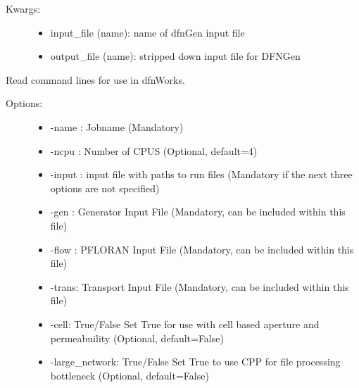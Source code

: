 \documentclass[letterpaper,10pt,english]{sphinxmanual}
\begin{document}
\begin{fulllineitems}
\begin{fulllineitems}
\begin{description}
\begin{itemize}
\end{itemize}

\item[{Kwargs:}] \leavevmode\begin{itemize}
\item {} 
input\_file (name): name of dfnGen input file

\item {} 
output\_file (name): stripped down input file for DFNGen

\end{itemize}

\end{description}

\end{fulllineitems}


\begin{fulllineitems}
\label{pydfnworks:pydfnworks.DFNWORKS.commandline_options}
Read command lines for use in dfnWorks.
\begin{description}
\item[{Options:}] \leavevmode\begin{itemize}
\item {} 
-name : Jobname (Mandatory)

\item {} 
-ncpu : Number of CPUS (Optional, default=4)

\item {} 
-input : input file with paths to run files (Mandatory if the next three options are not specified)

\item {} 
-gen : Generator Input File (Mandatory, can be included within this file)

\item {} 
-flow : PFLORAN Input File (Mandatory, can be included within this file)

\item {} 
-trans: Transport Input File (Mandatory, can be included within this file)

\item {} 
-cell: True/False Set True for use with cell based aperture and permeabuility (Optional, default=False)

\item {} 
-large\_network: True/False Set True to use CPP for file processing bottleneck (Optional, default=False)


\end{itemize}
\end{description}
\end{fulllineitems}
\end{fulllineitems}
\end{document}
